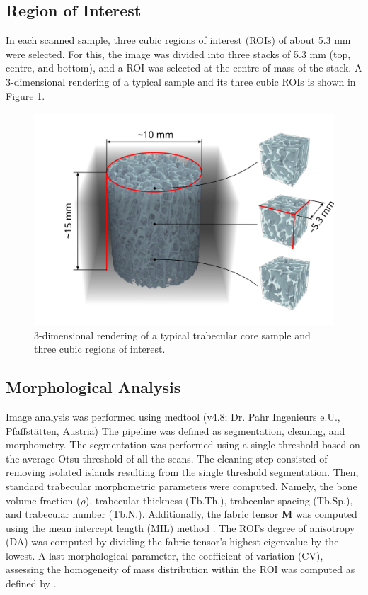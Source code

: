 \documentclass[a4paper,fleqn]{DC_ArtStyle}
\begin{document}
	\subsection{Region of Interest}
	In each scanned sample, three cubic regions of interest (ROIs) of about 5.3 mm were selected.
	For this, the image was divided into three stacks of 5.3 mm (top, centre, and bottom), and a ROI was selected at the centre of mass of the stack.
	A 3-dimensional rendering of a typical sample and its three cubic ROIs is shown in Figure \ref{FigSample}.
   
	\begin{figure}
		\includegraphics[width=\linewidth]{Sample}
		\caption{3-dimensional rendering of a typical trabecular core sample and three cubic regions of interest.}
		\label{FigSample}
	\end{figure}

	\subsection{Morphological Analysis}
	Image analysis was performed using medtool (v4.8; Dr. Pahr Ingenieurs e.U., Pfaffstätten, Austria)
	The pipeline was defined as segmentation, cleaning, and morphometry.
	The segmentation was performed using a single threshold based on the average Otsu threshold \cite{Otsu1979} of all the scans.
	The cleaning step consisted of removing isolated islands resulting from the single threshold segmentation.
	Then, standard trabecular morphometric parameters were computed.
	Namely, the bone volume fraction ($\rho$), trabecular thickness (Tb.Th.), trabecular spacing (Tb.Sp.), and trabecular number (Tb.N.).
	Additionally, the fabric tensor $\mathbf{M}$ was computed using the mean intercept length (MIL) method \cite{Moreno2014}.
	The ROI's degree of anisotropy (DA) was computed by dividing the fabric tensor's highest eigenvalue by the lowest.
	A last morphological parameter, the coefficient of variation (CV), assessing the homogeneity of mass distribution within the ROI was computed as defined by \citeauthor{Panyasantisuk2015} \cite{Panyasantisuk2015}.
\end{document}

